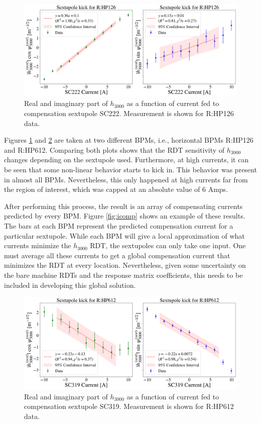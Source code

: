 \begin{figure}[H]
    \centering
    \includegraphics[width=\columnwidth]{chapter4/h3000_sc222.png}
    \caption{Real and imaginary part of $h_{3000}$ as a function of current fed to compensation sextupole SC222. Measurement is shown for R:HP126 data.}
    \label{fig:h3000_sc222}
\end{figure}

Figures \ref{fig:h3000_sc222} and \ref{fig:h3000_sc319} are taken at two different BPMs, i.e., horizontal BPMs R:HP126 and R:HP612. Comparing both plots shows that the RDT sensitivity of $h_{3000}$ changes depending on the sextupole used. Furthermore, at high currents, it can be seen that some non-linear behavior starts to kick in. This behavior was present in almost all BPMs. Nevertheless, this only happened at high currents far from the region of interest, which was capped at an absolute value of 6 Amps. 

After performing this process, the result is an array of compensating currents predicted by every BPM. Figure \ref{fig:icomp} shows an example of these results. The bars at each BPM represent the predicted compensation current for a particular sextupole. While each BPM will give a local approximation of what currents minimize the $h_{3000}$ RDT, the sextupoles can only take one input. One must average all these currents to get a global compensation current that minimizes the RDT at every location. Nevertheless, given some uncertainty on the bare machine RDTs and the response matrix coefficients, this needs to be included in developing this global solution. 

\begin{figure}[H]
    \centering
    \includegraphics[width=\columnwidth]{chapter4/h3000_sc319.png}
    \caption{Real and imaginary part of $h_{3000}$ as a function of current fed to compensation sextupole SC319. Measurement is shown for R:HP612 data.}
    \label{fig:h3000_sc319}
\end{figure}

